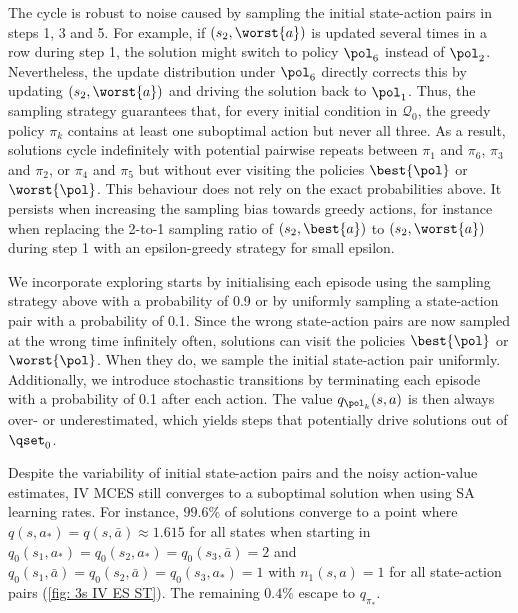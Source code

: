\documentclass{article}
\begin{document}
The cycle is robust to noise caused by sampling the initial state-action pairs in steps 1, 3 and 5.
For example, if $(s_2, \worst{a})$ is updated several times in a row during step 1, the solution might switch to policy $\pol_6$ instead of $\pol_2$.
Nevertheless, the update distribution under $\pol_6$ directly corrects this by updating $(s_2, \worst{a})$ and driving the solution back to $\pol_1$.
Thus, the sampling strategy guarantees that, for every initial condition in $\mathcal Q_0$, the greedy policy $\pi_k$ contains at least one suboptimal action but never all three.
As a result, 
solutions cycle indefinitely with potential pairwise repeats between $\pi_1$ and $\pi_6$, $\pi_3$ and $\pi_2$, or $\pi_4$ and $\pi_5$ but without ever visiting the policies $\best{\pol}$ or $\worst{\pol}$.
This behaviour does not rely on the exact probabilities above.
It persists when increasing the sampling bias towards greedy actions,
for instance when replacing the 2-to-1 sampling ratio of $(s_2, \best{a})$ to $(s_2, \worst{a})$ during step 1 with an epsilon-greedy strategy for small epsilon.

We incorporate exploring starts 
by initialising each episode using the sampling strategy above with a probability of 0.9 
or by uniformly sampling a state-action pair with a probability of 0.1.
Since the wrong state-action pairs are now sampled at the wrong time infinitely often,
solutions can visit the policies $\best{\pol}$ or $\worst{\pol}$.
When they do, we sample the initial state-action pair uniformly.
Additionally, we introduce stochastic transitions by terminating each episode with a probability of 0.1 after each action.
The value $q_{\pol_k}(s,a)$ is then always over- or underestimated, which yields steps that potentially drive solutions out of $\qset_0$.





Despite the variability of initial state-action pairs and the noisy action-value estimates, IV MCES still converges to a suboptimal solution when using SA learning rates.
For instance,
$99.6\%$ of solutions converge to a point where $q(s, a_*) = q(s, \bar a) \approx 1.615$ for all states
when starting in
$q_0(s_1,a_*) = q_0(s_2,a_*) = q_0(s_3,\bar a) = 2$
and
$q_0(s_1,\bar a) = q_0(s_2, \bar a) = q_0(s_3,a_*) = 1$
with $n_1(s,a)=1$ for all state-action pairs (\autoref{fig: 3s IV ES ST}).
The remaining $0.4\%$ escape to $q_{\pi_*}$.
\end{document}

